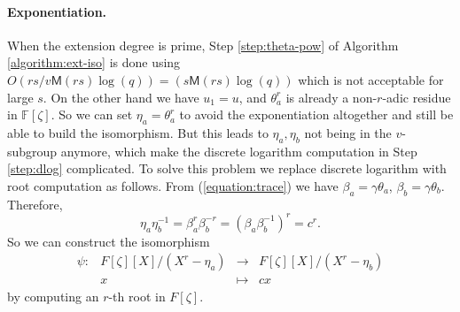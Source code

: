 \documentclass[12pt]{article}
\theoremstyle{plain}
\theoremstyle{definition}
\def\F{\ensuremath{\mathbb{F}}}
\def\MM{\ensuremath{\mathsf{M}}}
\newcounter{algorithm}
\begin{document}
\paragraph{Exponentiation.}
When the extension degree is prime, Step \ref{step:theta-pow} of Algorithm \ref{algorithm:ext-iso} 
is done using $O(rs/v\MM(rs)\log(q)) = (s\MM(rs)\log(q))$ which is not acceptable for large $s$. On 
the other hand we have $u_1 = u$, and $\theta_a^r$ is already a non-$r$-adic residue in 
$\F[\zeta]$. So we can set $\eta_a = \theta_a^r$ to avoid the exponentiation altogether and still 
be able to build the isomorphism. But this leads to $\eta_a, \eta_b$ not being in the $v$-subgroup 
anymore, which make the discrete logarithm computation in Step \ref{step:dlog} complicated. To 
solve this problem we replace discrete logarithm with root computation as follows. From 
(\ref{equation:trace}) we have $\beta_a = \gamma\theta_a$,  $\beta_b = \gamma\theta_b$. Therefore, 
\[ \eta_a\eta_b^{-1} = \beta_a^r\beta_b^{-r} = (\beta_a\beta_b^{-1})^r = c^r. \] 
So we can construct the isomorphism
\begin{equation*}
	\begin{array}{rrll}
	\psi: & F[\zeta][X] / (X^r - \eta_a) & \longrightarrow & F[\zeta][X] / (X^r - \eta_b) \\
	& x & \longmapsto & cx
	\end{array}
\end{equation*}
by computing an $r$-th root in $F[\zeta]$.
%
\end{document}
